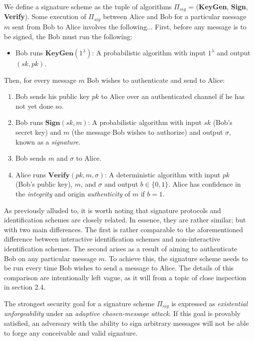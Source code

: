 We define a signature scheme as the tuple of algorithms $\Pi_{sig}$ = (\textbf{KeyGen}, \textbf{Sign}, \textbf{Verify}). Some execution of $\Pi_{sig}$ between Alice and Bob for a particular message $m$ sent from Bob to Alice involves the following...
\noindent
First, before any message is to be signed, the Bob must run the following:
\begin{itemize}
\item Bob runs $\textbf{KeyGen}(1^\lambda)$: A probabilistic algorithm with input $1^\lambda$ and output $(sk,pk)$.
\end{itemize}
Then, for every message $m$ Bob wishes to authenticate and send to Alice: 
\begin{enumerate}[label=(\roman*)]
\item Bob sends his public key $pk$ to Alice over an authenticated channel if he has not yet done so.
\item Bob runs $\textbf{Sign}(sk, m)$: A probabilistic algorithm with input $sk$ (Bob's secret key) and $m$ (the message Bob wishes to authorize) and output $\sigma$, known as a \emph{signature}.
\item Bob sends $m$ and $\sigma$ to Alice.
\item Alice runs $\textbf{Verify}(pk, m, \sigma)$: A deterministic algorithm with input $pk$ (Bob's public key), $m$, and $\sigma$ and output $b \in \{0,1\}$. Alice has confidence in the \emph{integrity} and origin \emph{authenticity} of $m$ if $b = 1$.
\end{enumerate}

As previously alluded to, it is worth noting that signature protocols and identification schemes are closely related. In essence, they are rather similar; but with two main differences. The first is rather comparable to the aforementioned difference between interactive identification schemes and non-interactive identification schemes. The second arises as a result of aiming to authenticate Bob on any particular message $m$. To achieve this, the signature scheme needs to be run every time Bob wishes to send a message to Alice. The details of this comparison are intentionally left vague, as it will from a topic of close inspection in section 2.4.

The strongest security goal for a signature scheme $\Pi_{sig}$ is expressed as \emph{existential unforgeability} under an \emph{adaptive chosen-message attack}. If this goal is provably satisfied, an adversary with the ability to sign arbitrary messages will not be able to forge any conceivable and valid signature.

